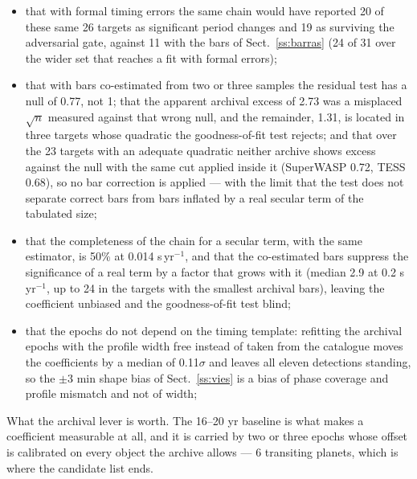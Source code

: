 \documentclass{aa}
\begin{document}
\begin{itemize}
\item that with formal timing errors the same chain would have reported 20 of these same 26 targets as significant period changes and 19 as surviving the adversarial gate, against 11 with the bars of Sect.~\ref{ss:barras} (24 of 31 over the wider set that reaches a fit with formal errors);
\item that with bars co-estimated from two or three samples the residual test has a null of 0.77, not 1; that the apparent archival excess of 2.73 was a misplaced $\sqrt{n}$ measured against that wrong null, and the remainder, 1.31, is located in three targets whose quadratic the goodness-of-fit test rejects; and that over the 23 targets with an adequate quadratic neither archive shows excess against the null with the same cut applied inside it (SuperWASP 0.72, TESS 0.68), so no bar correction is applied --- with the limit that the test does not separate correct bars from bars inflated by a real secular term of the tabulated size;
\item that the completeness of the chain for a secular term, with the same estimator, is 50\% at 0.014 s\,yr$^{-1}$, and that the co-estimated bars suppress the significance of a real term by a factor that grows with it (median 2.9 at 0.2 s\,yr$^{-1}$, up to 24 in the targets with the smallest archival bars), leaving the coefficient unbiased and the goodness-of-fit test blind;
\item that the epochs do not depend on the timing template: refitting the archival epochs with the profile width free instead of taken from the catalogue moves the coefficients by a median of 0.11$\sigma$ and leaves all eleven detections standing, so the $\pm$3 min shape bias of Sect.~\ref{ss:vies} is a bias of phase coverage and profile mismatch and not of width;
\end{itemize}

What the archival lever is worth. The 16--20 yr baseline is what makes a coefficient measurable at all, and it is carried by two or three epochs whose offset is calibrated on every object the archive allows --- 6 transiting planets, which is where the candidate list ends.
\end{document}
